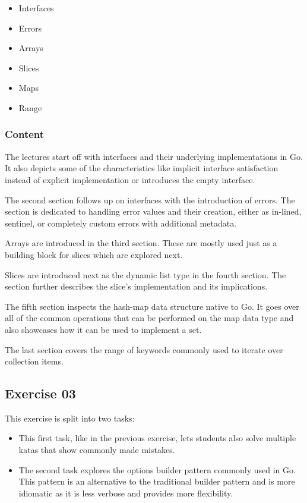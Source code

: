 \documentclass[
  digital,
  color,
  oneside,
  nosansbold,
  nocolorbold,
  nolof,
  nolot,
]{fithesis4}
\begin{document}
\begin{itemize}
    \item Interfaces
    \item Errors
    \item Arrays
    \item Slices
    \item Maps
    \item Range
\end{itemize}

\subsubsection{Content}

The lectures start off with interfaces and their underlying implementations in Go. It also depicts some of the characteristics like implicit interface satisfaction instead of explicit implementation or introduces the empty interface.

The second section follows up on interfaces with the introduction of errors. The section is dedicated to handling error values and their creation, either as in-lined, sentinel, or completely custom errors with additional metadata.

Arrays are introduced in the third section. These are mostly used just as a building block for slices which are explored next.

Slices are introduced next as the dynamic list type in the fourth section. The section further describes the slice's implementation and its implications.

The fifth section inspects the hash-map data structure native to Go. It goes over all of the common operations that can be performed on the map data type and also showcases how it can be used to implement a set. 

The last section covers the range of keywords commonly used to iterate over collection items.

\subsection{Exercise 03}

This exercise is split into two tasks:
\begin{itemize}
    \item This first task, like in the previous exercise, lets students also solve multiple katas that show commonly made mistakes.
    \item The second task explores the options builder pattern commonly used in Go. This pattern is an alternative to the traditional builder pattern and is more idiomatic as it is less verbose and provides more flexibility.
\end{itemize}
\end{document}
